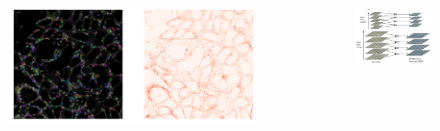 \documentclass[unknownkeysallowed]{beamer}
\begin{document}
\begin{frame}
\begin{columns}
		\begin{column}{0.4\paperwidth}
		\begin{figure}\includegraphics[width=0.5\paperwidth,height=0.3\paperheight]{images/sift_result_0}
		\end{figure}
		\end{column}
		\hspace{8mm}
		\begin{column}{0.4\paperwidth}
		\begin{figure}\includegraphics[width=0.4\paperwidth,height=0.4\paperheight]{images/sift_dog}
		\end{figure}
		\end{column}
		\end{columns}
	\end{frame}
	
\end{document}
